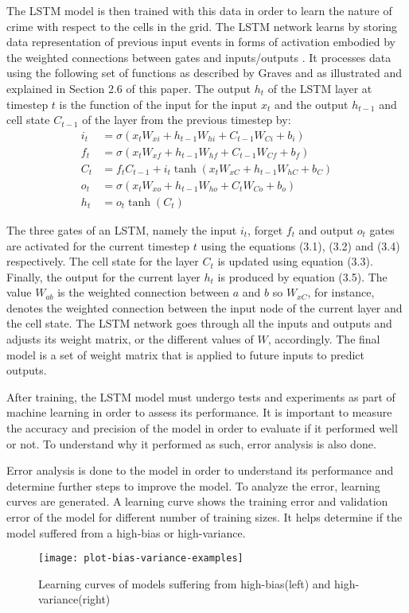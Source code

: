 The LSTM model is then trained with this data in order to learn the nature of crime with respect to the cells in the grid. The LSTM network learns by storing data representation of previous input events in forms of activation embodied by the weighted connections between gates and inputs/outputs \citep{hochreiter1997long}. It processes data using the following set of functions as described by Graves \citeyearpar{graves2013generating} and as illustrated and explained in Section 2.6 of this paper. The output \( h_t \) of the LSTM layer at timestep $t$ is the function of the input for the input \( x_t \) and the output \( h_{t-1} \) and cell state \( C_{t-1} \) of the layer from the previous timestep by:
    \begin{align}
    i_t &= \sigma(x_t W_{xi} + h_{t-1} W_{hi} + C_{t-1} W_{Ci} + b_i) \\
    f_t &= \sigma(x_t W_{xf} + h_{t-1} W_{hf} + C_{t-1} W_{Cf} + b_f) \\
    C_t &= f_t C_{t-1} + i_t \tanh(x_t W_{xC} + h_{t-1} W_{hC} + b_C) \\
    o_t &= \sigma(x_t W_{xo} + h_{t-1} W_{ho} + C_t W_{Co} + b_o) \\
    h_t &= o_t \tanh(C_t)
    \end{align}

The three gates of an LSTM, namely the input \( i_t \), forget \( f_t \) and output \( o_t \) gates are activated for the current timestep $t$ using the equations (3.1), (3.2) and (3.4) respectively. The cell state for the layer \( C_t \) is updated using equation (3.3). Finally, the output for the current layer \( h_t \) is produced by equation (3.5). The value \(W_{ab}\) is the weighted connection between $a$ and $b$ so \(W_{xC}\), for instance, denotes the weighted connection between the input node of the current layer and the cell state. The LSTM network goes through all the inputs and outputs and adjusts its weight matrix, or the different values of $W$, accordingly. The final model is a set of weight matrix that is applied to future inputs to predict outputs.

After training, the LSTM model must undergo tests and experiments as part of machine learning in order to assess its performance. It is important to measure the accuracy and precision of the model in order to evaluate if it performed well or not. To understand why it performed as such, error analysis is also done.

Error analysis is done to the model in order to understand its performance and determine further steps to improve the model. To analyze the error, learning curves are generated. A learning curve shows the training error and validation error of the model for different number of training sizes. It helps determine if the model suffered from a high-bias or high-variance.
\begin{figure}[H]
    \centering
    \texttt{[image: plot-bias-variance-examples]}
    \caption{Learning curves of models suffering from high-bias(left) and high-variance(right) \citep{scikit-learn}}
\end{figure}

